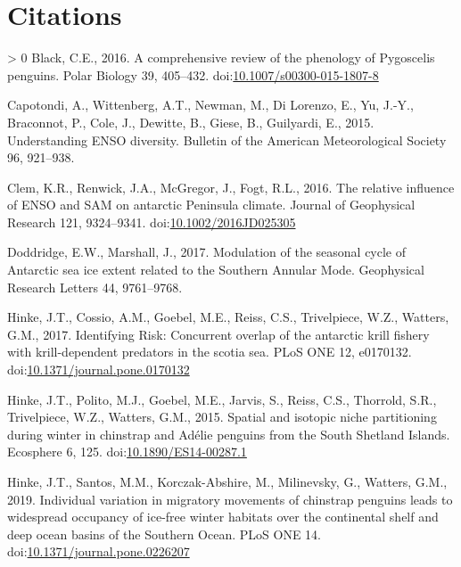 \documentclass[]{elsarticle} %
\newlength{\cslhangindent}
\newenvironment{CSLReferences}[3] %
 {%
  \setlength{\parindent}{0pt}
  \ifodd #1 \everypar{\setlength{\hangindent}{\cslhangindent}}\ignorespaces\fi
  \ifnum #2 > 0
  \setlength{\parskip}{#2\baselineskip}
  \fi
 }%
 {}
\begin{document}
\hypertarget{citations}{%
\section*{Citations}\label{citations}}

\hypertarget{refs}{}
\begin{CSLReferences}{1}{0}
\leavevmode\hypertarget{ref-Black2016}{}%
Black, C.E., 2016. A comprehensive review of the phenology of
{Pygoscelis} penguins. Polar Biology 39, 405--432.
doi:\href{https://doi.org/10.1007/s00300-015-1807-8}{10.1007/s00300-015-1807-8}

\leavevmode\hypertarget{ref-capotondiUnderstandingENSODiversity2015}{}%
Capotondi, A., Wittenberg, A.T., Newman, M., Di Lorenzo, E., Yu, J.-Y.,
Braconnot, P., Cole, J., Dewitte, B., Giese, B., Guilyardi, E., 2015.
Understanding {ENSO} diversity. Bulletin of the American Meteorological
Society 96, 921--938.

\leavevmode\hypertarget{ref-Clem2016}{}%
Clem, K.R., Renwick, J.A., McGregor, J., Fogt, R.L., 2016. The relative
influence of {ENSO} and {SAM} on antarctic {Peninsula} climate. Journal
of Geophysical Research 121, 9324--9341.
doi:\href{https://doi.org/10.1002/2016JD025305}{10.1002/2016JD025305}

\leavevmode\hypertarget{ref-doddridgeModulationSeasonalCycle2017}{}%
Doddridge, E.W., Marshall, J., 2017. Modulation of the seasonal cycle of
{Antarctic} sea ice extent related to the {Southern Annular Mode}.
Geophysical Research Letters 44, 9761--9768.

\leavevmode\hypertarget{ref-Hinke2017}{}%
Hinke, J.T., Cossio, A.M., Goebel, M.E., Reiss, C.S., Trivelpiece, W.Z.,
Watters, G.M., 2017. Identifying {Risk}: {Concurrent} overlap of the
antarctic krill fishery with krill-dependent predators in the scotia
sea. PLoS ONE 12, e0170132.
doi:\href{https://doi.org/10.1371/journal.pone.0170132}{10.1371/journal.pone.0170132}

\leavevmode\hypertarget{ref-Hinke2015}{}%
Hinke, J.T., Polito, M.J., Goebel, M.E., Jarvis, S., Reiss, C.S.,
Thorrold, S.R., Trivelpiece, W.Z., Watters, G.M., 2015. Spatial and
isotopic niche partitioning during winter in chinstrap and {Adélie}
penguins from the {South Shetland Islands}. Ecosphere 6, 125.
doi:\href{https://doi.org/10.1890/ES14-00287.1}{10.1890/ES14-00287.1}

\leavevmode\hypertarget{ref-Hinke2019}{}%
Hinke, J.T., Santos, M.M., Korczak-Abshire, M., Milinevsky, G., Watters,
G.M., 2019. Individual variation in migratory movements of chinstrap
penguins leads to widespread occupancy of ice-free winter habitats over
the continental shelf and deep ocean basins of the {Southern Ocean}.
PLoS ONE 14.
doi:\href{https://doi.org/10.1371/journal.pone.0226207}{10.1371/journal.pone.0226207}


\end{CSLReferences}
\end{document}
